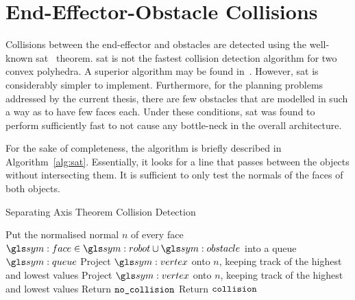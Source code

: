 \section{End-Effector-Obstacle Collisions}%
\label{sec:end_effector_obstacle_collisions}

	Collisions between the end-effector and obstacles are detected using the
	well-known
	\gls{sat}~\cite{bib:planning:hierarchical_structure_for_rapid_interference_detection}
	theorem. \gls{sat} is not the fastest collision detection algorithm for two
	convex polyhedra. A superior algorithm may be found
	in~\cite{bib:planning:detecting_intersections_between_convex_polyhedra}.
	However, \gls{sat} is considerably simpler to implement. Furthermore, for
	the planning problems addressed by the current thesis, there are few
	obstacles that are modelled in such a way as to have few faces each. Under
	these conditions, \gls{sat} was found to perform sufficiently fast to not
	cause any bottle-neck in the overall architecture.

	For the sake of completeness, the algorithm is briefly described in
	Algorithm~\ref{alg:sat}. Essentially, it looks for a line that passes
	between the objects without intersecting them. It is sufficient to only test
	the normals of the faces of both objects.

	\begin{algorithm}[ht]
		\caption{Separating Axis Theorem Collision Detection}%
		\label{alg:sat}
		\begin{algorithmic}[1]
				\State{}Put the normalised normal $n$ of every face $\face \in \robot\cup\obstacle$ into a queue $\queue$
						\State{}Project $\vertex$ onto $n$, keeping track of the highest and lowest values
					\EndFor{}
						\State{}Project $\vertex$ onto $n$, keeping track of the highest and lowest values
					\EndFor{}
						\State{} Return $\texttt{no\_collision}$
					\EndIf{}
				\EndFor{}
				\State{}Return $\texttt{collision}$
			\EndProcedure{}
		\end{algorithmic}
	\end{algorithm}
